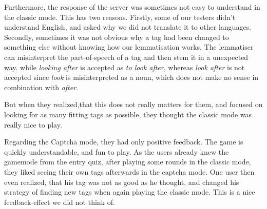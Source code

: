 Furthermore, the response of the server was sometimes not easy to understand in the classic mode.
This has two reasons.
Firstly, some of our testers didn't understand English, and asked why we did not translate it to other languages.
Secondly, sometimes it was not obvious why a tag had been changed to something else without knowing how our lemmatisation works.
The lemmatiser can misinterpret the part-of-speech of a tag and then stem it in a unexpected way.
while \textit{looking after} is accepted as \textit{to look after}, whereas \textit{look after} is not accepted since \textit{look} is misinterpreted as a noun, which does not make no sense in combination with \textit{after}.

But when they realized,that this does not really matters for them, and focused on looking for as many fitting tags as possible, they thought the classic mode was really nice to play.

Regarding the Captcha mode, they had only positive feedback. The game is quickly understandable, and fun to play.
As the users already knew the gamemode from the entry quiz, after playing some rounds in the classic mode, they liked seeing their own tags afterwards in the captcha mode.
One user then even realized, that his tag was not as good as he thought, and changed his strategy of finding new tags when again playing the classic mode.
This is a nice feedback-effect we did not think of.
